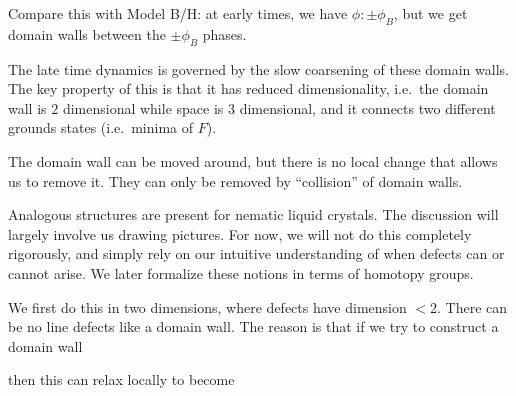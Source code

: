 \documentclass[a4paper]{article}
\begin{document}
Compare this with Model B/H: at early times, we have $\phi: \pm \phi_B$, but we get domain walls between the $\pm \phi_B$ phases.
\begin{center}
\end{center}
The late time dynamics is governed by the slow coarsening of these domain walls. The key property of this is that it has reduced dimensionality, i.e.\ the domain wall is $2$ dimensional while space is $3$ dimensional, and it connects two different grounds states (i.e.\ minima of $F$).

The domain wall can be moved around, but there is no local change that allows us to remove it. They can only be removed by ``collision'' of domain walls.

Analogous structures are present for nematic liquid crystals. The discussion will largely involve us drawing pictures. For now, we will not do this completely rigorously, and simply rely on our intuitive understanding of when defects can or cannot arise. We later formalize these notions in terms of homotopy groups.

We first do this in two dimensions, where defects have dimension $< 2$. There can be no line defects like a domain wall. The reason is that if we try to construct a domain wall
\begin{center}
\end{center}
then this can relax locally to become
\begin{center}
\end{center}
\end{document}

